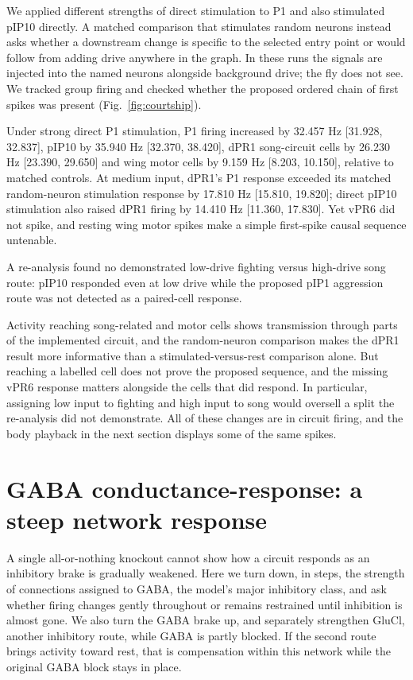 \documentclass[11pt]{article}
\begin{document}
We applied different strengths of direct stimulation to P1 and also stimulated pIP10 directly. A matched comparison that stimulates random neurons instead asks whether a downstream change is specific to the selected entry point or would follow from adding drive anywhere in the graph. In these runs the signals are injected into the named neurons alongside background drive; the fly does not see. We tracked group firing and checked whether the proposed ordered chain of first spikes was present (Fig.~\ref{fig:courtship}).

Under strong direct P1 stimulation, P1 firing increased by 32.457 Hz [31.928, 32.837], pIP10 by 35.940 Hz [32.370, 38.420], dPR1 song-circuit cells by 26.230 Hz [23.390, 29.650] and wing motor cells by 9.159 Hz [8.203, 10.150], relative to matched controls. At medium input, dPR1's P1 response exceeded its matched random-neuron stimulation response by 17.810 Hz [15.810, 19.820]; direct pIP10 stimulation also raised dPR1 firing by 14.410 Hz [11.360, 17.830]. Yet vPR6 did not spike, and resting wing motor spikes make a simple first-spike causal sequence untenable.

A re-analysis found no demonstrated low-drive fighting versus high-drive song route: pIP10 responded even at low drive while the proposed pIP1 aggression route was not detected as a paired-cell response.

Activity reaching song-related and motor cells shows transmission through parts of the implemented circuit, and the random-neuron comparison makes the dPR1 result more informative than a stimulated-versus-rest comparison alone. But reaching a labelled cell does not prove the proposed sequence, and the missing vPR6 response matters alongside the cells that did respond. In particular, assigning low input to fighting and high input to song would oversell a split the re-analysis did not demonstrate. All of these changes are in circuit firing, and the body playback in the next section displays some of the same spikes.

\section*{GABA conductance-response: a steep network response}
A single all-or-nothing knockout cannot show how a circuit responds as an inhibitory brake is gradually weakened. Here we turn down, in steps, the strength of connections assigned to GABA, the model's major inhibitory class, and ask whether firing changes gently throughout or remains restrained until inhibition is almost gone. We also turn the GABA brake up, and separately strengthen GluCl, another inhibitory route, while GABA is partly blocked. If the second route brings activity toward rest, that is compensation within this network while the original GABA block stays in place.
\end{document}
